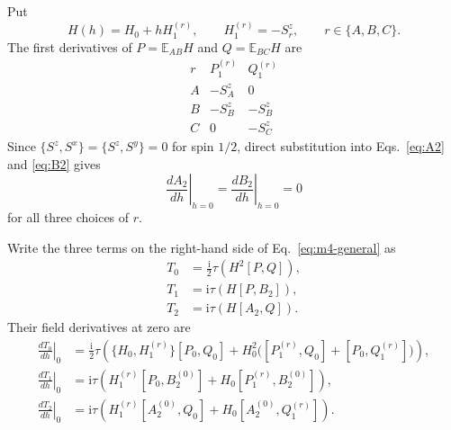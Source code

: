 \documentclass[aps,prb,preprint,nofootinbib,longbibliography]{revtex4-2}
\newcommand{\ii}{\mathrm{i}}
\newcommand{\E}{\mathbb{E}}
\begin{document}
Put
\begin{equation}
 H(h)=H_0+hH_1^{(r)},
 \qquad
 H_1^{(r)}=-S_r^z,
 \qquad r\in\{A,B,C\}.
 \label{eq:field-perturbation}
\end{equation}
The first derivatives of $P=\E_{AB}H$ and $Q=\E_{BC}H$ are
\begin{equation}
\begin{array}{c|cc}
 r&P_1^{(r)}&Q_1^{(r)}\\
 \hline
 A&-S_A^z&0\\
 B&-S_B^z&-S_B^z\\
 C&0&-S_C^z
\end{array}
\label{eq:P1Q1-table}
\end{equation}
Since $\{S^z,S^x\}=\{S^z,S^y\}=0$ for spin $1/2$, direct substitution into
Eqs.~\eqref{eq:A2} and \eqref{eq:B2} gives
\begin{equation}
 \left.\frac{dA_2}{dh}\right|_{h=0}
 =\left.\frac{dB_2}{dh}\right|_{h=0}=0
 \label{eq:A2B2-derivatives}
\end{equation}
for all three choices of $r$.

Write the three terms on the right-hand side of
Eq.~\eqref{eq:m4-general} as
\begin{align}
 T_0&=\frac{\ii}{2}\tau(H^2[P,Q]),
 \label{eq:T0}\\
 T_1&=\ii\tau(H[P,B_2]),
 \label{eq:T1}\\
 T_2&=\ii\tau(H[A_2,Q]).
 \label{eq:T2}
\end{align}
Their field derivatives at zero are
\begin{align}
 \left.\frac{dT_0}{dh}\right|_0
 &=\frac{\ii}{2}\tau\left(
 \{H_0,H_1^{(r)}\}[P_0,Q_0]
 +H_0^2\bigl([P_1^{(r)},Q_0]+[P_0,Q_1^{(r)}]\bigr)
 \right),
 \label{eq:T0-derivative}\\
 \left.\frac{dT_1}{dh}\right|_0
 &=\ii\tau\left(
 H_1^{(r)}[P_0,B_2^{(0)}]
 +H_0[P_1^{(r)},B_2^{(0)}]
 \right),
 \label{eq:T1-derivative}\\
 \left.\frac{dT_2}{dh}\right|_0
 &=\ii\tau\left(
 H_1^{(r)}[A_2^{(0)},Q_0]
 +H_0[A_2^{(0)},Q_1^{(r)}]
 \right).
 \label{eq:T2-derivative}
\end{align}
\end{document}
